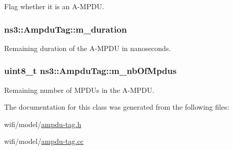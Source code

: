 Flag whether it is an A-\/\+M\+P\+DU. 

\subsubsection[{\texorpdfstring{m\+\_\+duration}{m_duration}}]{ ns3\+::\+Ampdu\+Tag\+::m\+\_\+duration\hspace{0.3cm}{\ttfamily [private]}}\hypertarget{classns3_1_1AmpduTag_a35ee6675183604c7b5dda5579ced3b13}{}\label{classns3_1_1AmpduTag_a35ee6675183604c7b5dda5579ced3b13}


Remaining duration of the A-\/\+M\+P\+DU in nanoseconds. 

\subsubsection[{\texorpdfstring{m\+\_\+nb\+Of\+Mpdus}{m_nbOfMpdus}}]{\setlength{\rightskip}{0pt plus 5cm}uint8\+\_\+t ns3\+::\+Ampdu\+Tag\+::m\+\_\+nb\+Of\+Mpdus\hspace{0.3cm}{\ttfamily [private]}}\hypertarget{classns3_1_1AmpduTag_af7d038a557bd07ea38664700b14ccffb}{}\label{classns3_1_1AmpduTag_af7d038a557bd07ea38664700b14ccffb}


Remaining number of M\+P\+D\+Us in the A-\/\+M\+P\+DU. 



The documentation for this class was generated from the following files\+:\begin{DoxyCompactItemize}
\item 
wifi/model/\hyperlink{ampdu-tag_8h}{ampdu-\/tag.\+h}\item 
wifi/model/\hyperlink{ampdu-tag_8cc}{ampdu-\/tag.\+cc}\end{DoxyCompactItemize}
